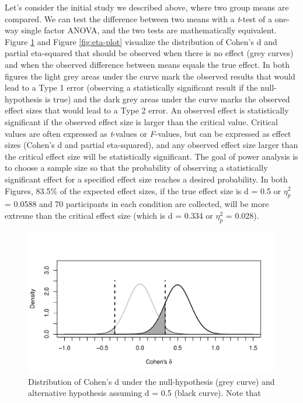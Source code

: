 \documentclass[,man,floatsintext]{apa6}
\begin{document}
Let's consider the initial study we described above, where two group
means are compared. We can test the difference between two means with a
\emph{t}-test of a one-way single factor ANOVA, and the two tests are
mathematically equivalent. Figure \ref{fig:d-plot} and Figure
\ref{fig:eta-plot} visualize the distribution of Cohen's d and partial
eta-squared that should be observed when there is no effect (grey
curves) and when the observed difference between means equals the true
effect. In both figures the light grey areas under the curve mark the
observed results that would lead to a Type 1 error (observing a
statistically significant result if the null-hypothesis is true) and the
dark grey areas under the curve marks the observed effect sizes that
would lead to a Type 2 error. An observed effect is statistically
significant if the observed effect size is larger than the critical
value. Critical values are often expressed as \emph{t}-values or
\emph{F}-values, but can be expressed as effect sizes (Cohen's d and
partial eta-squared), and any observed effect size larger than the
critical effect size will be statistically significant. The goal of
power analysis is to choose a sample size so that the probability of
observing a statistically significant effect for a specified effect size
reaches a desired probability. In both Figures, 83.5\% of the expected
effect sizes, if the true effect size is d = 0.5 or \(\eta_p^2\) =
0.0588 and 70 participants in each condition are collected, will be more
extreme than the critical effect size (which is d = 0.334 or
\(\eta_p^2\) = 0.028).

\begin{figure}
\centering
\includegraphics{0.1_Simulation_Based_Power_Analysis_For_Factorial_ANOVA_Designs_files/figure-latex/d-plot-1.pdf}
\caption{\label{fig:d-plot}Distribution of Cohen's d under the
null-hypothesis (grey curve) and alternative hypothesis assuming d = 0.5
(black curve). Note that}
\end{figure}
\end{document}
